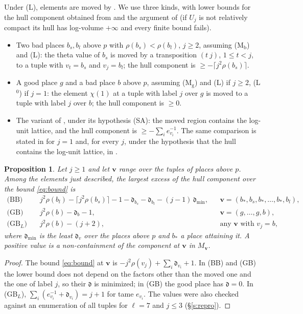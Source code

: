 \documentclass[11pt]{amsart}
\newtheorem{proposition}[theorem]{Proposition}
\theoremstyle{remark}
\newcommand{\dd}{\mathfrak d}
\newcommand{\bv}{\mathbf v}
\begin{document}
Under (L), elements are moved by \cite[Lemma~4]{Note}. We use three kinds, with lower bounds for the hull component
obtained from \cite[(1.1)--(1.3)]{Note} and the argument of \cite[Thm.~5]{Note} (if $U_j$ is not relatively compact
its hull has log-volume $+\infty$ and every finite bound fails).
\begin{itemize}
\item[(BB)] Two bad places $b_s,b_l$ above $p$ with $\rho(b_s)<\rho(b_l)$, $j\ge2$, assuming (M$_{\mathrm b}$) and
(L): the theta value of $b_s$ is moved by a transposition $(t\ j)$, $1\le t<j$, to a tuple with $v_t=b_s$ and
$v_j=b_l$; the hull component is $\ge-\lceil j^2\rho(b_s)\rceil$.
\item[(GB)] A good place $g$ and a bad place $b$ above $p$, assuming (M$_{\mathrm g}$) and (L) if $j\ge2$, (L$^0$)
if $j=1$: the element $\chi(1)$ at a tuple with label $j$ over $g$ is moved to a tuple with label $j$ over $b$; the
hull component is $\ge0$.
\item[(GB$_L$)] The variant of \cite[Thm.~8.1]{FirstFull}, under its hypothesis (SA): the moved region contains the
log-unit lattice, and the hull component is $\ge-\sum_i e_{v_i}^{-1}$. The same comparison is stated in
\cite[Thm.~5]{First} for $j=1$ and, for every $j$, under the hypothesis that the hull contains the log-unit lattice,
in \cite[Prop.~5]{Fourth}.
\end{itemize}

\begin{proposition}\label{p:closed}
Let $j\ge1$ and let $\bv$ range over the tuples of places above $p$. Among the elements just described, the largest
excess of the hull component over the bound \eqref{eq:bound} is
\begin{align*}
\text{(BB)}\quad & j^2\rho(b_l)-\lceil j^2\rho(b_s)\rceil-1-\dd_{b_s}-\dd_{b_l}-(j-1)\,\dd_{\min},
 &&\bv=(b_*,b_s,b_*,\dots,b_*,b_l),\\
\text{(GB)}\quad & j^2\rho(b)-\dd_b-1, &&\bv=(g,\dots,g,b),\\
\text{(GB$_L$)}\quad & j^2\rho(b)-(j+2), &&\text{any }\bv\text{ with }v_j=b,
\end{align*}
where $\dd_{\min}$ is the least $\dd_v$ over the places above $p$ and $b_*$ a place attaining it. A positive value is a
non-containment of the component at $\bv$ in $M_{\bv}$.
\end{proposition}

\begin{proof}
The bound \eqref{eq:bound} at $\bv$ is $-j^2\rho(v_j)+\sum_i\dd_{v_i}+1$. In (BB) and (GB) the lower bound does not
depend on the factors other than the moved one and the one of label $j$, so their $\dd$ is minimized; in (GB) the good
place has $\dd=0$. In (GB$_L$), $\sum_i(e_{v_i}^{-1}+\dd_{v_i})=j+1$ for tame $e_{v_i}$. The values were also checked
against an enumeration of all tuples for $\ell=7$ and $j\le3$ (\S\ref{s:repro}).
\end{proof}
\end{document}
